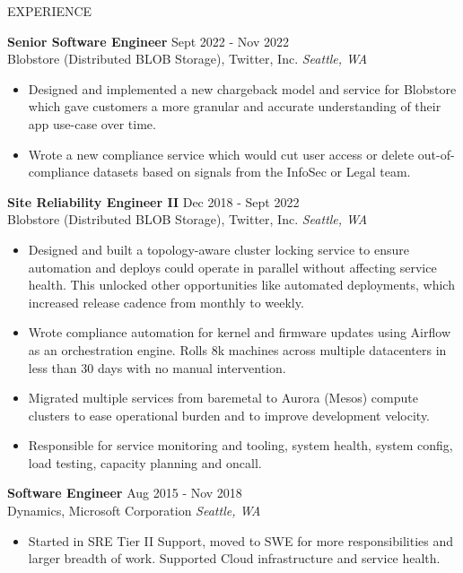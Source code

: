 \documentclass{resume}
\begin{document}
\begin{rSection}{EXPERIENCE}

\textbf{Senior Software Engineer} \hfill Sept 2022 - Nov 2022\\
Blobstore (Distributed BLOB Storage), Twitter, Inc. \hfill \textit{Seattle, WA}
 \begin{itemize}
    \itemsep -3pt {} 
     \item Designed and implemented a new chargeback model and service for Blobstore which gave customers a more granular and accurate understanding of their app use-case over time. 
     \item Wrote a new compliance service which would cut user access or delete out-of-compliance datasets based on signals from the InfoSec or Legal team. 
 \end{itemize}

 \textbf{ Site Reliability Engineer II} \hfill Dec 2018 - Sept 2022\\
Blobstore (Distributed BLOB Storage), Twitter, Inc. \hfill \textit{Seattle, WA}
 \begin{itemize}
    \itemsep -3pt {} 
     \item Designed and built a topology-aware cluster locking service to ensure automation and deploys could operate in parallel without affecting service health. This unlocked other opportunities like automated deployments, which increased release cadence from monthly to weekly.
     \item Wrote compliance automation for kernel and firmware updates using Airflow as an orchestration engine. Rolls 8k machines across multiple datacenters in less than 30 days with no manual intervention. 
     \item Migrated multiple services from baremetal to Aurora (Mesos) compute clusters to ease operational burden and to improve development velocity.
     \item Responsible for service monitoring and tooling, system health, system config, load testing, capacity planning and oncall.
 \end{itemize}

\textbf{Software Engineer} \hfill Aug 2015 - Nov 2018\\
Dynamics, Microsoft Corporation \hfill \textit{Seattle, WA}
 \begin{itemize}
    \itemsep -3pt {} 
     \item Started in SRE Tier II Support, moved to SWE for more responsibilities and larger breadth of work. Supported Cloud infrastructure and service health. 
 \end{itemize}
\end{rSection} 
\end{document}
